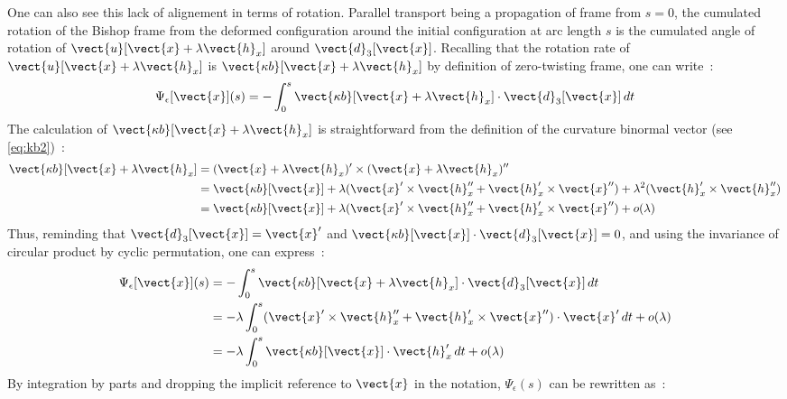 One can also see this lack of alignement in terms of rotation. Parallel transport being a propagation of frame from $s = 0$, the cumulated rotation of the Bishop frame from the deformed configuration around the initial configuration at arc length $s$ is the cumulated angle of rotation of $\vect{u}[\vect{x} + \lambda\vect{h}_x]$ around $\vect{d}_3[\vect{x}]$. Recalling that the rotation rate of $\vect{u}[\vect{x} + \lambda\vect{h}_x]$ is $\vect{\kappa b}[\vect{x} + \lambda\vect{h}_x]$ by definition of zero-twisting frame, one can write~:
\begin{equation}
	\Psi_\epsilon[\vect{x}](s) =
	-\int_0^s \vect{\kappa b}[\vect{x} + \lambda\vect{h}_x] \cdot \vect{d}_3[\vect{x}] \,dt
\end{equation}
The calculation of $\vect{\kappa b}[\vect{x} + \lambda\vect{h}_x]$ is straightforward from the definition of the curvature binormal vector (see \cref{eq:kb2})~:
\begin{equation}
	\begin{aligned}
	\vect{\kappa b}[\vect{x} + \lambda\vect{h}_x]
	&= (\vect{x} + \lambda\vect{h}_x)' \times (\vect{x} + \lambda\vect{h}_x)'' \\
	&= \vect{\kappa b}[\vect{x}] + \lambda(\vect{x}'\times\vect{h}''_x + \vect{h}'_x\times\vect{x}'') + \lambda^2(\vect{h}'_x \times \vect{h}''_x) \\
	&= \vect{\kappa b}[\vect{x}] + \lambda(\vect{x}'\times\vect{h}''_x + \vect{h}'_x\times\vect{x}'') + o(\lambda)
	\end{aligned}
\end{equation}
Thus, reminding that $\vect{d}_3[\vect{x}] = \vect{x}'$ and $\vect{\kappa b}[\vect{x}]\cdot\vect{d}_3[\vect{x}] = 0$, and using the invariance of circular product by cyclic permutation, one can express~:
\begin{equation}
	\begin{aligned}
		\Psi_\epsilon[\vect{x}](s)
		&= -\int_0^s \vect{\kappa b}[\vect{x} + \lambda\vect{h}_x] \cdot \vect{d}_3[\vect{x}] \,dt\\
		&= - \lambda \int_0^s (\vect{x}'\times\vect{h}''_x + \vect{h}'_x\times\vect{x}'') \cdot \vect{x}' \,dt + o(\lambda)\\
		&= - \lambda \int_0^s \vect{\kappa b}[\vect{x}]\cdot\vect{h}'_x \,dt + o(\lambda)\\
	\end{aligned}
\end{equation}
By integration by parts and dropping the implicit reference to $\vect{x}$ in the notation, $\Psi_\epsilon(s)$ can be rewritten as~:
